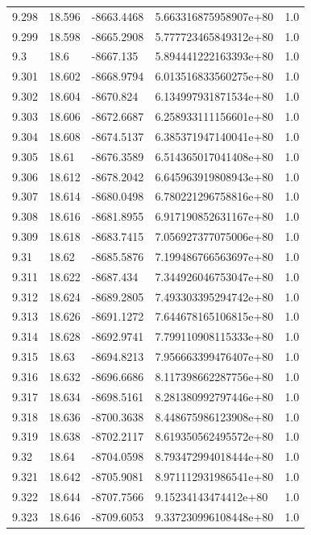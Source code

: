 \begin{tabular}{lllll}
9.298 & 18.596 & -8663.4468 & 5.663316875958907e+80 & 1.0 \\
9.299 & 18.598 & -8665.2908 & 5.777723465849312e+80 & 1.0 \\
9.3 & 18.6 & -8667.135 & 5.894441222163393e+80 & 1.0 \\
9.301 & 18.602 & -8668.9794 & 6.013516833560275e+80 & 1.0 \\
9.302 & 18.604 & -8670.824 & 6.134997931871534e+80 & 1.0 \\
9.303 & 18.606 & -8672.6687 & 6.258933111156601e+80 & 1.0 \\
9.304 & 18.608 & -8674.5137 & 6.385371947140041e+80 & 1.0 \\
9.305 & 18.61 & -8676.3589 & 6.514365017041408e+80 & 1.0 \\
9.306 & 18.612 & -8678.2042 & 6.645963919808943e+80 & 1.0 \\
9.307 & 18.614 & -8680.0498 & 6.780221296758816e+80 & 1.0 \\
9.308 & 18.616 & -8681.8955 & 6.917190852631167e+80 & 1.0 \\
9.309 & 18.618 & -8683.7415 & 7.056927377075006e+80 & 1.0 \\
9.31 & 18.62 & -8685.5876 & 7.199486766563697e+80 & 1.0 \\
9.311 & 18.622 & -8687.434 & 7.344926046753047e+80 & 1.0 \\
9.312 & 18.624 & -8689.2805 & 7.493303395294742e+80 & 1.0 \\
9.313 & 18.626 & -8691.1272 & 7.644678165106815e+80 & 1.0 \\
9.314 & 18.628 & -8692.9741 & 7.799110908115333e+80 & 1.0 \\
9.315 & 18.63 & -8694.8213 & 7.956663399476407e+80 & 1.0 \\
9.316 & 18.632 & -8696.6686 & 8.117398662287756e+80 & 1.0 \\
9.317 & 18.634 & -8698.5161 & 8.281380992797446e+80 & 1.0 \\
9.318 & 18.636 & -8700.3638 & 8.448675986123908e+80 & 1.0 \\
9.319 & 18.638 & -8702.2117 & 8.619350562495572e+80 & 1.0 \\
9.32 & 18.64 & -8704.0598 & 8.793472994018444e+80 & 1.0 \\
9.321 & 18.642 & -8705.9081 & 8.971112931986541e+80 & 1.0 \\
9.322 & 18.644 & -8707.7566 & 9.15234143474412e+80 & 1.0 \\
9.323 & 18.646 & -8709.6053 & 9.337230996108448e+80 & 1.0 \\

\end{tabular}
